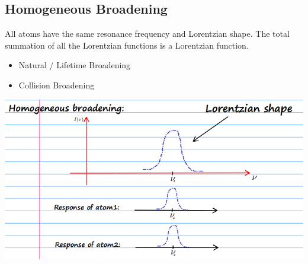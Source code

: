 \documentclass[11pt]{article}
\begin{document}
\subsection{Homogeneous Broadening}
All atoms have the same resonance frequency and Lorentzian shape. The total summation of all the Lorentzian functions is a Lorentzian function.
\begin{itemize}
    \item Natural / Lifetime Broadening
    \item Collision Broadening
\end{itemize}
\begin{center}
    \includegraphics[scale=0.6]{1.png}
\end{center}
\end{document}
